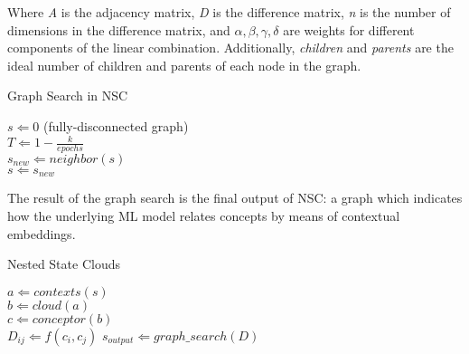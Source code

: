 Where \textit{A} is the adjacency matrix, \textit{D} is the difference matrix, \textit{n} is the number of dimensions in the difference matrix, and $\alpha, \beta, \gamma, \delta$ are weights for different components of the linear combination. Additionally, \textit{children} and \textit{parents} are the ideal number of children and parents of each node in the graph.

\begin{algorithm}[!tbp] 
    \caption{Graph Search in NSC}
    \label{alg:gs}
    \begin{algorithmic}
        \STATE $s \Leftarrow 0 $ (fully-disconnected graph) \\
        \STATE $T \Leftarrow 1 - \frac{k}{epochs}$ \\
        \STATE $s_{new} \Leftarrow neighbor(s)$ \\
            \STATE $s \Leftarrow s_{new}$
        \ENDIF
        \ENDFOR
    \end{algorithmic}
\end{algorithm}

The result of the graph search is the final output of NSC: a graph which indicates how the underlying ML model relates concepts by means of contextual embeddings.

\begin{algorithm}[!tbp] 
    \caption{Nested State Clouds}
    \label{alg:gs}
    \begin{algorithmic}
            \STATE $a \Leftarrow contexts(s)$ \\
            \STATE $b \Leftarrow cloud(a)$ \\
            \STATE $c \Leftarrow conceptor(b)$ \\
        \ENDFOR
                \STATE $D_{ij} \Leftarrow f(c_i, c_j)$
            \ENDFOR
        \ENDFOR
        \STATE $s_{output} \Leftarrow graph\_search(D)$
    \end{algorithmic}
\end{algorithm}